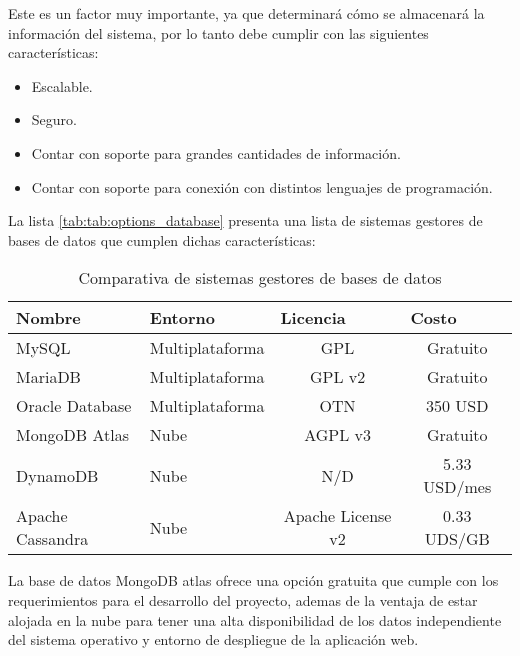 Este es un factor muy importante, ya que determinará cómo se almacenará la información del sistema, por lo tanto debe cumplir con las siguientes características:

\begin{itemize}
    \item Escalable.
    \item Seguro.
    \item Contar con soporte para grandes cantidades de información.
    \item Contar con soporte para conexión con distintos lenguajes de programación.
\end{itemize}


La lista \ref{tab:tab:options_database} presenta una lista de sistemas gestores de bases de datos que cumplen dichas características:

\begin{table}[h!]
    \centering
    \begin{tabular}{|l|l|c|c|}
    \hline
    Nombre           & Entorno         & \multicolumn{1}{l|}{Licencia} & \multicolumn{1}{l|}{Costo} \\ \hline
    MySQL            & Multiplataforma & GPL                           & Gratuito                   \\ \hline
    MariaDB          & Multiplataforma & GPL v2                        & Gratuito                   \\ \hline
    Oracle Database  & Multiplataforma & OTN                           & 350 USD                    \\ \hline
    \rowcolor[HTML]{66BB6A}
    MongoDB Atlas     & Nube            & AGPL v3                       & Gratuito                   \\ \hline
    DynamoDB         & Nube            & N/D                           & 5.33 USD/mes               \\ \hline
    Apache Cassandra & Nube            & Apache License v2             & 0.33 UDS/GB                \\ \hline
    \end{tabular}
    \caption{Comparativa de sistemas gestores de bases de datos}
    \label{tab:options_database}
    \end{table}


La base de datos MongoDB atlas ofrece una opción gratuita que cumple con los requerimientos para el desarrollo del proyecto, ademas de la ventaja de estar alojada en la nube para tener una alta disponibilidad de los datos independiente del sistema operativo y entorno de despliegue de la aplicación web.


